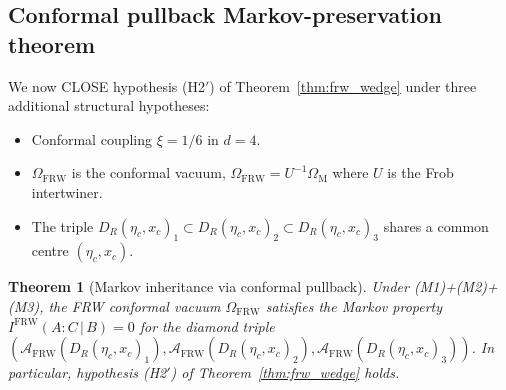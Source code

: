 \documentclass[11pt,a4paper]{article}
\newtheorem{theorem}{Theorem}
\theoremstyle{remark}
\newcommand{\FRW}{{\mathrm{FRW}}}
\newcommand{\Mink}{{\mathrm{M}}}
\newcommand{\A}{\mathcal{A}}
\newcommand{\DR}{D_R(\eta_c,x_c)}
\begin{document}
\subsection{Conformal pullback Markov-preservation theorem}
\label{sec:markov_pullback}

We now CLOSE hypothesis (H2$'$) of Theorem~\ref{thm:frw_wedge} under
three additional structural hypotheses:

\begin{itemize}
\item[\textbf{(M1)}] Conformal coupling $\xi = 1/6$ in $d = 4$.
\item[\textbf{(M2)}] $\Omega_{\FRW}$ is the conformal vacuum,
  $\Omega_{\FRW} = U^{-1}\Omega_{\Mink}$ where $U$ is the
  Frob~\cite{Frob2023} intertwiner.
\item[\textbf{(M3)}] The triple $\DR_1 \subset \DR_2 \subset \DR_3$
  shares a common centre $(\eta_c, x_c)$.
\end{itemize}

\begin{theorem}[Markov inheritance via conformal pullback]
\label{thm:markov_inherit}
Under (M1)+(M2)+(M3), the FRW conformal vacuum $\Omega_{\FRW}$
satisfies the Markov property
$I^{\FRW}(A:C\,|\,B) = 0$ for the diamond triple
$(\A_{\FRW}(\DR_1), \A_{\FRW}(\DR_2), \A_{\FRW}(\DR_3))$.
In particular, hypothesis (H2$'$) of Theorem~\ref{thm:frw_wedge} holds.
\end{theorem}
\end{document}
